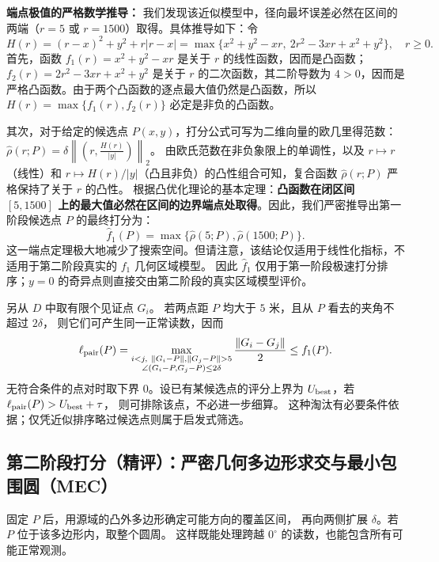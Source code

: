\textbf{端点极值的严格数学推导：} 我们发现该近似模型中，径向最坏误差必然在区间的两端（$r=5$ 或 $r=1500$）取得。具体推导如下：令
\[
H(r)=(r-x)^2+y^2+r|r-x|
=\max\{x^2+y^2-xr,\ 2r^2-3xr+x^2+y^2\},\quad r\ge0.
\]
首先，函数 $f_1(r) = x^2+y^2-xr$ 是关于 $r$ 的线性函数，因而是凸函数；$f_2(r) = 2r^2-3xr+x^2+y^2$ 是关于 $r$ 的二次函数，其二阶导数为 $4 > 0$，因而是严格凸函数。由于两个凸函数的逐点最大值仍然是凸函数，所以 $H(r) = \max\{f_1(r), f_2(r)\}$ 必定是非负的凸函数。

其次，对于给定的候选点 $P(x,y)$，打分公式可写为二维向量的欧几里得范数：$\widehat\rho(r;P)=\delta \left\| \left( r, \frac{H(r)}{|y|} \right) \right\|_2$。
由欧氏范数在非负象限上的单调性，以及 $r \mapsto r$（线性）和 $r \mapsto H(r)/|y|$（凸且非负）的凸性组合可知，复合函数 $\widehat\rho(r;P)$ 严格保持了关于 $r$ 的凸性。
根据凸优化理论的基本定理：\textbf{凸函数在闭区间 $[5, 1500]$ 上的最大值必然在区间的边界端点处取得}。因此，我们严密推导出第一阶段候选点 $P$ 的最终打分为：
\begin{equation}
\widehat f_1(P)=\max\{\widehat\rho(5;P),\widehat\rho(1500;P)\}.
\end{equation}
这一端点定理极大地减少了搜索空间。但请注意，该结论仅适用于线性化指标，不适用于第二阶段真实的 $f_1$ 几何区域模型。
因此 $\widehat f_1$ 仅用于第一阶段极速打分排序；$y=0$ 的奇异点则直接交由第二阶段的真实区域模型评价。

另从 $D$ 中取有限个见证点 $G_i$。
若两点距 $P$ 均大于 $5$ 米，且从 $P$ 看去的夹角不超过 $2\delta$，
则它们可产生同一正常读数，因而
\begin{equation}
\ell_{\rm pair}(P)=
\max_{\substack{i<j,\ \|G_i-P\|,\|G_j-P\|>5\\
\angle(G_i-P,G_j-P)\le2\delta}}
\frac{\|G_i-G_j\|}{2}\le f_1(P).
\end{equation}
无符合条件的点对时取下界 $0$。设已有某候选点的评分上界为
$U_{\rm best}$，若 $\ell_{\rm pair}(P)>U_{\rm best}+\tau$，
则可排除该点，不必进一步细算。
这种淘汰有必要条件依据；仅凭近似排序略过候选点则属于启发式筛选。

\subsection{第二阶段打分（精评）：严密几何多边形求交与最小包围圆（MEC）}

固定 $P$ 后，用源域的凸外多边形确定可能方向的覆盖区间，
再向两侧扩展 $\delta$。若 $P$ 位于该多边形内，取整个圆周。
这样既能处理跨越 $0^\circ$ 的读数，也能包含所有可能正常观测。

